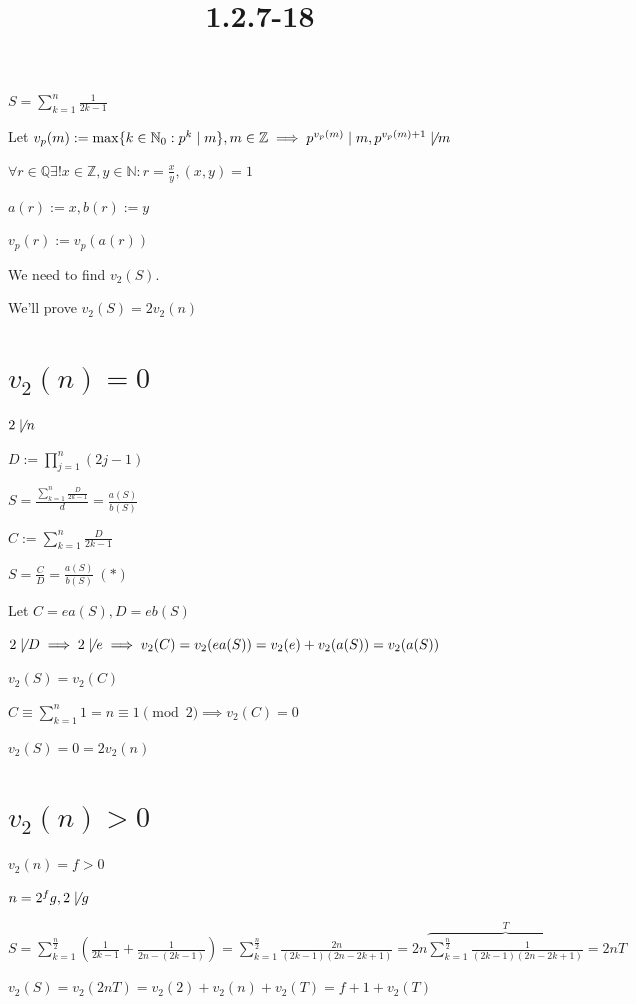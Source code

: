 \documentclass{article}
\title{1.2.7-18}
\begin{document}
\maketitle

\( S = \sum_{k=1}^{n} \frac{1}{2k-1} \)

Let \( v_p(m) := \max \{ k \in \mathbb{N}_0: p^k \mid m \}, m \in \mathbb{Z} \implies p^{v_p(m)} \mid m, p^{v_p(m) + 1} \not\mid m \)

\( \forall r\in\mathbb{Q} \exists! x\in\mathbb{Z}, y\in\mathbb{N}: r = \frac{x}{y}, (x,y)=1 \)

\( a(r) := x, b(r) := y \)

\( v_p(r) := v_p(a(r)) \)

We need to find \( v_2(S) \).

We'll prove \( v_2(S) = 2 v_2(n) \)

\section*{\( v_2(n) = 0 \)}

\( 2 \not\mid n \)

\( D := \prod_{j=1}^n (2j-1) \)

\( S = \frac{\sum_{k=1}^n \frac{D}{2k-1}}{d} = \frac{a(S)}{b(S)} \)

\( C := \sum_{k=1}^n \frac{D}{2k-1} \)

\( S = \frac{C}{D} = \frac{a(S)}{b(S)}\ (*) \)

Let \( C = ea(S), D = eb(S) \)

\( 2 \not\mid D \implies 2 \not\mid e \implies v_2(C) = v_2(ea(S)) = v_2(e) + v_2(a(S)) = v_2(a(S)) \)

\( v_2(S) = v_2(C) \)

\( C \equiv \sum_{k=1}^n 1 = n \equiv 1 \pmod 2 \implies v_2(C) = 0 \)

\( v_2(S) = 0 = 2 v_2(n) \)

\section*{\( v_2(n) > 0 \)}

\( v_2(n) = f > 0 \)

\( n = 2^f g, 2 \not\mid g \)

\( S = \sum_{k=1}^{\frac{n}{2}}(\frac{1}{2k-1} + \frac{1}{2n-(2k-1)}) = \sum_{k=1}^{\frac{n}{2}}\frac{2n}{(2k-1)(2n-2k+1)} = 2n \overbrace{\sum_{k=1}^{\frac{n}{2}}\frac{1}{(2k-1)(2n-2k+1)}}^{T} = 2nT \)

\( v_2(S) = v_2(2nT) = v_2(2) + v_2(n) + v_2(T) = f + 1 + v_2(T) \)
\end{document}
